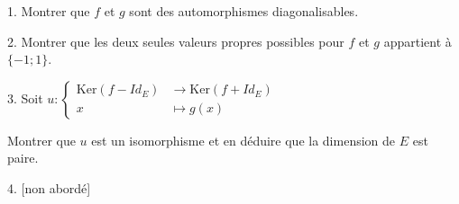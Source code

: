 \vspace{5pt}
1. Montrer que $f$ et $g$ sont des automorphismes diagonalisables.

\vspace{5pt}
2. Montrer que les deux seules valeurs propres possibles pour $f$ et $g$ appartient à $\{-1; 1\}$.

\vspace{5pt}
3. Soit $u :  
\begin{cases}
  \mathrm{Ker}(f - Id_E) & \longrightarrow \mathrm{Ker}(f + Id_E) \\    
  x & \longmapsto \displaystyle g(x)
\end{cases}
$

Montrer que $u$ est un isomorphisme et en déduire que la dimension de $E$ est paire.

\vspace{5pt}
4. [non abordé]



\subetoiles